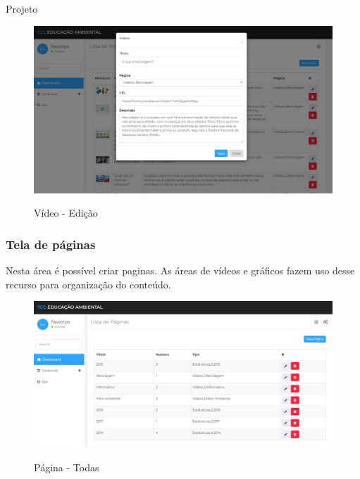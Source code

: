\documentclass[
	12pt,				%
	openright,			%
	twoside,			%
	a4paper,			%
	english,			%
	french,				%
	spanish,			%
	brazil				%
	]{abntex2}
\begin{document}
\begin{chapter}{Projeto}
\begin{figure}[h]
\centering
   \caption{Vídeo - Edição}
   \includegraphics[scale=0.40]{media/tela_video_site_2.png}
     \label{fig:tela_video_site_2}
\end{figure}

\newpage
\subsubsection{Tela de páginas} \label{tela_paginas}
Nesta área é possível criar paginas. As áreas de vídeos e gráficos fazem uso desse recurso para organização do conteúdo.

\begin{figure}[h]
\centering
   \caption{Página - Todas}
   \includegraphics[scale=0.40]{media/tela_pagina_site_1.png}
     \label{fig:tela_pagina_site_1}
\end{figure}


\end{chapter}
\end{document}

